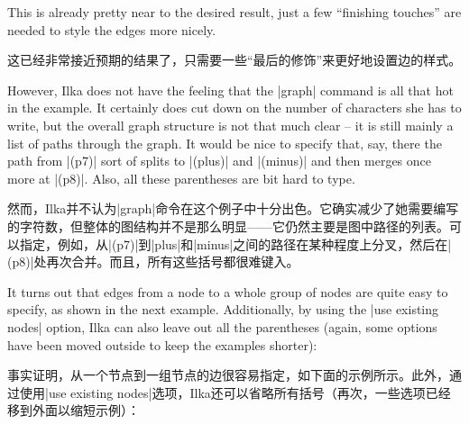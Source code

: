This is already pretty near to the desired result, just a few ``finishing
touches'' are needed to style the edges more nicely.

这已经非常接近预期的结果了，只需要一些“最后的修饰”来更好地设置边的样式。

However, Ilka does not have the feeling that the |graph| command is all that
hot in the example. It certainly does cut down on the number of characters she
has to write, but the overall graph structure is not that much clear -- it is
still mainly a list of paths through the graph. It would be nice to specify
that, say, there the path from |(p7)| sort of splits to |(plus)| and |(minus)|
and then merges once more at |(p8)|. Also, all these parentheses are bit hard
to type.

然而，Ilka并不认为|graph|命令在这个例子中十分出色。它确实减少了她需要编写的字符数，但整体的图结构并不是那么明显——它仍然主要是图中路径的列表。可以指定，例如，从|(p7)|到|plus|和|minus|之间的路径在某种程度上分叉，然后在|(p8)|处再次合并。而且，所有这些括号都很难键入。

It turns out that edges from a node to a whole group of nodes are quite easy to
specify, as shown in the next example. Additionally, by using the
|use existing nodes| option, Ilka can also leave out all the parentheses
(again, some options have been moved outside to keep the examples shorter):

事实证明，从一个节点到一组节点的边很容易指定，如下面的示例所示。此外，通过使用|use existing nodes|选项，Ilka还可以省略所有括号（再次，一些选项已经移到外面以缩短示例）：

%
\begin{codeexample}[
    preamble={\usetikzlibrary{arrows.meta,graphs,shapes.misc}},
    pre={\tikzset{
    ampersand replacement=\&,
    point/.style={coordinate},
    skip loop/.style={to path={-- ++(0,##1) -| (\tikztotarget)}},
    hv path/.style={to path={-| (\tikztotarget)}},
    vh path/.style={to path={|- (\tikztotarget)}},
}},
]
\end{codeexample}



